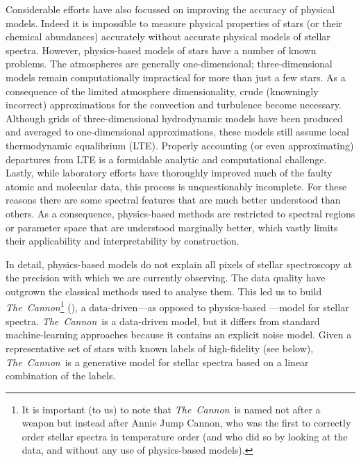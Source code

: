\documentclass[12pt,preprint]{aastex}
\newcommand{\project}[1]{\textsl{#1}}
\newcommand{\TheCannon}{\project{The~Cannon}}
\begin{document}
Considerable efforts have also focussed on improving the accuracy of physical
models.  Indeed it is impossible to measure physical properties of stars (or 
their chemical abundances) accurately without accurate physical models of 
stellar spectra.  However, physics-based models of stars have a number of known
problems.  The atmospheres are generally one-dimensional; three-dimensional
models remain computationally impractical for more than just a few stars.  As a
consequence of the limited atmosphere dimensionality, crude (knowningly 
incorrect) approximations for the convection and turbulence become necessary. 
Although grids of three-dimensional hydrodynamic models have been produced 
and averaged to one-dimensional approximations, these models still assume local
thermodynamic equalibrium (LTE).  Properly accounting (or even approximating) 
departures from LTE is a formidable analytic and computational challenge.
Lastly, while laboratory efforts have thoroughly improved much of the faulty
atomic and molecular data, this process is unquestionably incomplete.  For these
reasons there are some spectral features that are much better understood than
others.  As a consequence, physics-based methods are restricted to spectral
regions or parameter space that are understood marginally better, which vastly
limits their applicability and interpretability by construction.



In detail, physics-based models do not explain all pixels of stellar 
spectroscopy at the precision with which we are currently observing.  The data
quality have outgrown the classical methods used to analyse them.  This led us 
to build \TheCannon\footnote{It is important (to us) to note that \TheCannon\ is named not after a weapon but instead after Annie Jump Cannon, who was the first to
correctly order stellar spectra in temperature order (and who did so
by looking at the data, and without any use of physics-based models).} (\citealt{tc}), a data-driven---as opposed to physics-based
---model for stellar spectra.  \TheCannon\ is a data-driven model, but it differs from standard machine-learning
approaches because it contains an explicit noise model. Given a representative set of stars with
known labels of high-fidelity (see below), \TheCannon\ is a generative 
model for stellar spectra based on a linear combination of the labels.
\end{document}
